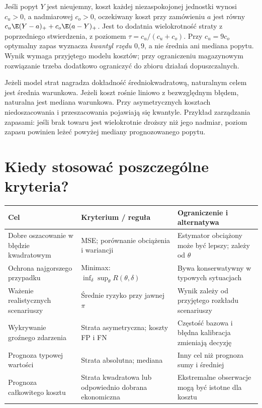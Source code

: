 \begin{przyklad}
Jeśli popyt $Y$ jest nieujemny, koszt każdej niezaspokojonej
jednostki wynosi $c_u>0$, a nadmiarowej $c_o>0$, oczekiwany koszt
przy zamówieniu $a$ jest równy
$c_u\E(Y-a)_++c_o\E(a-Y)_+$. Jest to dodatnia wielokrotność
straty z poprzedniego stwierdzenia, z poziomem
$\tau=c_u/(c_u+c_o)$. Przy $c_u=9c_o$ optymalny zapas wyznacza
\emph{kwantyl rzędu $0{,}9$}, a nie średnia ani mediana popytu.
Wynik wymaga przyjętego modelu kosztów; przy ograniczeniu
magazynowym rozwiązanie trzeba dodatkowo ograniczyć do
zbioru działań dopuszczalnych.
\end{przyklad}

\begin{uwaga}
Jeżeli model strat nagradza dokładność średniokwadratową, naturalnym
celem jest średnia warunkowa. Jeżeli koszt rośnie liniowo z
bezwzględnym błędem, naturalna jest mediana warunkowa.
Przy asymetrycznych kosztach niedoszacowania i przeszacowania
pojawiają się kwantyle. Przykład zarządzania zapasami: jeśli brak
towaru jest wielokrotnie droższy niż jego nadmiar, poziom zapasu
powinien leżeć powyżej mediany prognozowanego popytu.
\end{uwaga}

\section{Kiedy stosować poszczególne kryteria?}
\begin{center}\small
\begin{tabular}{>{\raggedright\arraybackslash}p{}>{\raggedright\arraybackslash}p{}>{\raggedright\arraybackslash}p{}}
\toprule
\textbf{Cel} & \textbf{Kryterium / reguła} & \textbf{Ograniczenie i alternatywa}\\
\midrule
Dobre oszacowanie w błędzie kwadratowym & MSE; porównanie obciążenia i wariancji & Estymator obciążony może być lepszy; zależy od $\theta$\\
Ochrona najgorszego przypadku & Minimax: $\inf_\delta\sup_\theta R(\theta,\delta)$ & Bywa konserwatywny w typowych sytuacjach\\
Ważenie realistycznych scenariuszy & Średnie ryzyko przy jawnej $\pi$ & Wynik zależy od przyjętego rozkładu scenariuszy\\
Wykrywanie groźnego zdarzenia & Strata asymetryczna; koszty FP i FN & Częstość bazowa i błędna kalibracja zmieniają decyzję\\
Prognoza typowej wartości & Strata absolutna; mediana & Inny cel niż prognoza sumy i średniej\\
Prognoza całkowitego kosztu & Strata kwadratowa lub odpowiednio dobrana ekonomiczna & Ekstremalne obserwacje mogą być istotne dla kosztu\\
\bottomrule
\end{tabular}
\end{center}

